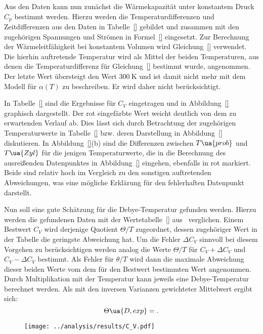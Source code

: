 Aus den Daten kann nun zunächst die Wärmekapazität unter konstantem Druck $C_p$ bestimmt werden. Hierzu werden 
die Temperaturdifferenzen und Zeitdifferenzen aus den Daten in Tabelle~\ref{} gebildet und zusammen mit den 
zugehörigen Spannungen und Strömen in Formel~\eqref{} eingesetzt. Zur Berechnung der Wärmeleitfähigkeit 
bei konstantem Volumen wird Gleichung~\eqref{} verwendet. Die hierhin auftretende Temperatur wird als Mittel 
der beiden Temperaturen, aus denen die Temperaturdifferenz für Gleichung~\eqref{} bestimmt wurde, angenommen. 
Der letzte Wert übersteigt den Wert $\SI{300}{\kelvin}$ und ist damit nicht mehr mit dem Modell für $\alpha(T)$
zu beschreiben. Er wird daher nicht berücksichtigt.

In Tabelle~\ref{} sind die Ergebnisse für $C_V$ eingetragen und in Abbildung~\ref{} graphisch dargestellt. 
Der rot eingefärbte Wert weicht deutlich von dem zu erwartenden Verlauf ab. Dies lässt sich durch Betrachtung der 
zugehörigen Temperaturwerte in Tabelle~\ref{} bzw. deren Darstellung in Abbildung~\ref{} diskutieren. In Abbildung~\ref{}(b)
sind die Differenzen zwischen $T\ua{prob}$ und $T\ua{Zyl}$ für die jenigen Temperaturwerte, die in die Berechnung des 
ausreißenden Datenpunktes in Abbildung~\ref{} eingehen, ebenfalls in rot markiert. Beide sind relativ hoch im Vergleich zu den 
sonstigen auftretenden Abweichungen, was eine mögliche Erklärung für den fehlerhaften Datenpunkt darstellt.  

Nun soll eine gute Schätzung für die Debye-Temperatur gefunden werden. Hierzu werden die gefundenen Daten mit der 
Wertetabelle~\ref{} aus~\cite{} verglichen. Einem Bestwert $C_V$ wird derjenige Quotient $\Theta / T$ zugeordnet, dessen 
zugehöriger Wert in der Tabelle die geringste Abweichung hat. Um die Fehler $\Delta C_V$ sinnvoll bei diesem 
Vorgehen zu berücksichtigen werden analog die Werte $\Theta / T$ für $C_V + \Delta C_V$ und $C_V - \Delta C_V$ bestimmt. 
Als Fehler für $\theta / T$ wird dann die maximale Abweichung dieser beiden Werte vom dem für den Bestwert bestimmten 
Wert angenommen. Durch Multiplikation mit der Temperatur kann jeweils eine Debye-Temperatur berechnet werden. 
Als mit den inversen Varianzen gewichteter Mittelwert ergibt sich: 
\begin{equation}
        \Theta\ua{D, exp} = .
\end{equation}

\begin{figure}
\centering
\texttt{[image: ../analysis/results/C\_V.pdf]}
\end{figure}